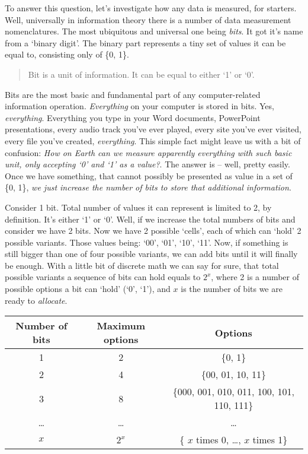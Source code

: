 \documentclass{article}
\begin{document}
            To answer this question, let's investigate how any data is measured, for starters. Well, universally in information theory there is a number of data 
            measurement nomenclatures. The most ubiquitous and universal one being \emph{bits}. It got it's name from a `binary digit'. The binary part represents a
            tiny set of values it can be equal to, consisting only of \{0, 1\}.

            \begin{quote}
                Bit is a unit of information. It can be equal to either `1' or `0'.
            \end{quote}

            Bits are the most basic and fundamental part of any computer-related information operation. \emph{Everything} on your computer is stored in bits. Yes, 
            \emph{everything}. Everything you type in your Word documents, PowerPoint presentations, every audio track you've ever played, every site you've ever 
            visited, every file you've created, \emph{everything}. This simple fact might leave us with a bit of confusion: \emph{How on Earth can we measure apparently
            everything with such basic unit, only accepting `0' and `1' as a value?}. The answer is -- well, pretty easily. Once we have something, that cannot possibly
            be presented as value in a set of \{0, 1\}, \emph{we just increase the number of bits to store that additional information}. \par

            Consider 1 bit. Total number of values it can represent is limited to 2, by definition. It's either `1' or `0'. Well, if we increase the total numbers
            of bits and consider we have 2 bits. Now we have 2 possible `cells', each of which can `hold' 2 possible variants. Those values being: `00', `01', `10', `11'.
            Now, if something is still bigger than one of four possible variants, we can add bits until it will finally be enough. With a little bit of discrete math
            we can say for sure, that total possible variants a sequence of bits can hold equals to $2^x$, where 2 is a number of possible options a bit can `hold' (`0', `1'), 
            and $x$ is the number of bits we are ready to \emph{allocate}.
            
            \begin{center}
                \begin{longtable}{|c|c|c|}
                    \hline
                    Number of bits & Maximum options & Options \\\hline
                    1 & 2 & \{0, 1\} \\\hline
                    2 & 4 & \{00, 01, 10, 11\} \\\hline
                    3 & 8 & \{000, 001, 010, 011, 100, 101, 110, 111\} \\\hline
                    \ldots & \ldots & \ldots \\\hline
                    $x$ & $2^x$ & \{ $x$ times 0, \ldots, $x$ times 1\} \\\hline
                \end{longtable}
            \end{center}
\end{document}
